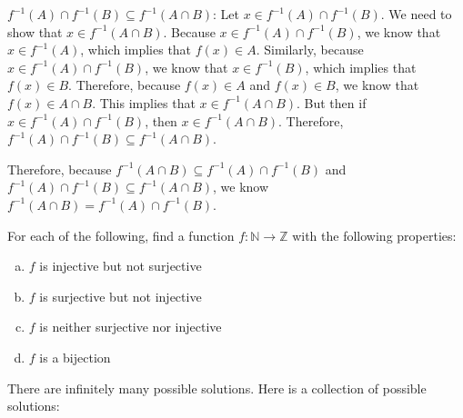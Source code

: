 \documentclass[11pt,letterpaper]{article}
\begin{document}
$f^{-1}(A) \cap f^{-1}(B) \subseteq f^{-1}(A \cap B)$: Let $x \in f^{-1}(A) \cap f^{-1}(B)$. We need to show that $x \in f^{-1}(A \cap B)$. Because $x \in f^{-1}(A) \cap f^{-1}(B)$, we know that $x \in f^{-1}(A)$, which implies that $f(x) \in A$. Similarly, because $x \in f^{-1}(A) \cap f^{-1}(B)$, we know that $x \in f^{-1}(B)$, which implies that $f(x) \in B$. Therefore, because $f(x) \in A$ and $f(x) \in B$, we know that $f(x) \in A \cap B$. This implies that $x \in f^{-1}(A \cap B)$. But then if $x \in f^{-1}(A) \cap f^{-1}(B)$, then $x \in f^{-1}(A \cap B)$. Therefore, $f^{-1}(A) \cap f^{-1}(B) \subseteq f^{-1}(A \cap B)$. \pspace

Therefore, because $f^{-1}(A \cap B) \subseteq f^{-1}(A) \cap f^{-1}(B)$ and $f^{-1}(A) \cap f^{-1}(B) \subseteq f^{-1}(A \cap B)$, we know $f^{-1}(A \cap B)= f^{-1}(A) \cap f^{-1}(B)$. 



\newpage



 For each of the following, find a function $f: \mathbb{N} \to \mathbb{Z}$ with the following properties:
        \begin{enumerate}[(a)]
        \item $f$ is injective but not surjective
        \item $f$ is surjective but not injective
        \item $f$ is neither surjective nor injective
        \item $f$ is a bijection
        \end{enumerate} \pspace

\sol There are infinitely many possible solutions. Here is a collection of possible solutions: 
\end{document}
